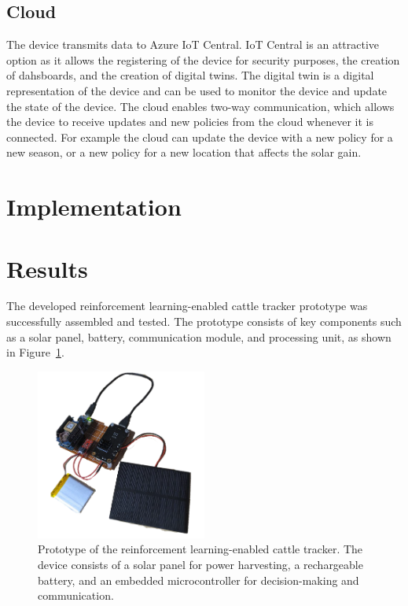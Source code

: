 \documentclass[10pt]{cai}
\begin{document}
\subsection{Cloud}
The device transmits data to Azure IoT Central.
IoT Central is an attractive option as it allows the registering of the device for security purposes, the creation of dahsboards, and the creation of digital twins.
The digital twin is a digital representation of the device and can be used to monitor the device and update the state of the device.
The cloud enables two-way communication, which allows the device to receive updates and new policies from the cloud whenever it is connected.
For example the cloud can update the device with a new policy for a new season, or a new policy for a new location that affects the solar gain.

\section{Implementation}


\section{Results}

The developed reinforcement learning-enabled cattle tracker prototype was successfully assembled and tested. The prototype consists of key components such as a solar panel, battery, communication module, and processing unit, as shown in Figure~\ref{fig:prototype}.

\begin{figure}[htbp]
  \centering
  \includegraphics[width=0.5\textwidth]{./figs/prototype_clean.png}
  \caption{Prototype of the reinforcement learning-enabled cattle tracker. The device consists of a solar panel for power harvesting, a rechargeable battery, and an embedded microcontroller for decision-making and communication.}
  \label{fig:prototype}
\end{figure}
\end{document}
